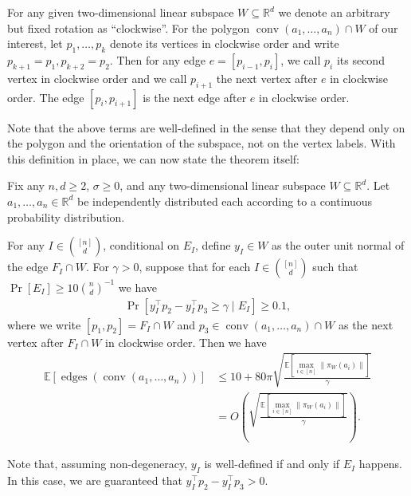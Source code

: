 \documentclass{theoretics}
\newcommand{\R}{\mathbb R}
\newcommand{\E}{\mathbb E}
\newcommand{\conv}{\operatorname{conv}}
\newcommand{\edges}{\operatorname{edges}}
\renewcommand{\subset}{\subseteq}
\begin{document}
\begin{definition}
    For any given two-dimensional linear subspace $W \subset \R^d$
    we denote an arbitrary but fixed rotation as ``clockwise''.
    For the polygon $\conv(a_1, \ldots, a_n) \cap W$ of our interest, let $p_1,\dots,p_k$
    denote its vertices in clockwise order and write $p_{k+1}=p_1, p_{k+2}=p_2$.
    Then for any edge $e = [p_{i-1}, p_i]$,
    we call $p_i$ its second vertex in clockwise order and
    we call $p_{i+1}$ the next vertex after $e$ in clockwise order.
    The edge $[p_i, p_{i+1}]$ is the next edge after $e$ in clockwise order.
\end{definition}
Note that the above terms are well-defined in the sense that they depend only on the polygon and
the orientation of the subspace, not on the vertex labels.
With this definition in place, we can now state the theorem itself:
\begin{theorem}\label{thm:ub-general}
    Fix any $n,d \geq 2$, $\sigma \geq 0$, and any two-dimensional linear subspace $W \subseteq \R^d$. 
    Let $a_1, \ldots, a_n \in \R^d$ be independently distributed each according to a
    continuous probability distribution.
    
    For any $I \in \binom{[n]}{d}$, conditional on $E_I$, 
    define $y_I \in W$ as the outer unit normal of the edge $F_I \cap W$.
    For $\gamma > 0$,
    suppose that for each $I \in \binom{[n]}{d}$ such that $\Pr[E_I] \geq 10 \binom{n}{d}^{-1}$ we have
    \begin{align*}
        \Pr[y_I^\top p_2 - y_I^\top p_3 \geq \gamma \mid E_I] \geq 0.1 ,
    \end{align*}
    where we write $[p_1, p_2] = F_I \cap W$ and $p_3 \in \conv(a_1, \ldots, a_n)\cap W$ as
    the next vertex after $F_I \cap W$ in clockwise order.
    Then we have
    \begin{align*}
        \E\left[ \edges\left(\conv(a_1, \ldots, a_n) \right) \right] &\leq 10 + 80\pi \sqrt{\frac{\E[\max_{i\in [n]} \|\pi_W(a_i)\|]}{\gamma}} \\
        &= O\left(\sqrt{\frac{\E[\max_{i \in [n]} \|\pi_W(a_i)\|]}{\gamma}} \right).
    \end{align*}
\end{theorem}
Note that, assuming non-degeneracy, $y_I$ is well-defined if and only if $E_I$ happens.
In this case, we are guaranteed that $y_I^\top p_2 - y_I^\top p_3 > 0$.
\end{document}
